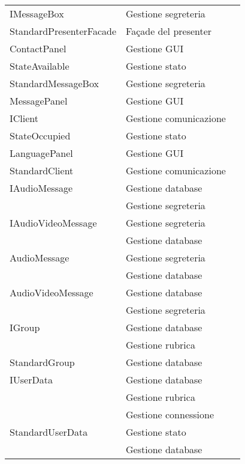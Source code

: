 \begin{center}
\begin{longtable}{lp{}l}
IMessageBox & Gestione segreteria \\
StandardPresenterFacade & Façade del presenter \\
ContactPanel & Gestione GUI \\
StateAvailable & Gestione stato \\
StandardMessageBox & Gestione segreteria \\
MessagePanel & Gestione GUI \\
IClient & Gestione comunicazione \\
StateOccupied & Gestione stato \\
LanguagePanel & Gestione GUI \\
StandardClient & Gestione comunicazione \\
IAudioMessage & Gestione database \\
 & Gestione segreteria \\
IAudioVideoMessage & Gestione segreteria \\
 & Gestione database \\
AudioMessage & Gestione segreteria \\
 & Gestione database \\
AudioVideoMessage & Gestione database \\
 & Gestione segreteria \\
IGroup & Gestione database \\
 & Gestione rubrica \\
StandardGroup & Gestione database \\
IUserData & Gestione database \\
 & Gestione rubrica \\
 & Gestione connessione \\
StandardUserData & Gestione stato \\
 & Gestione database \\
\bottomrule
\end{longtable}
\end{center}
